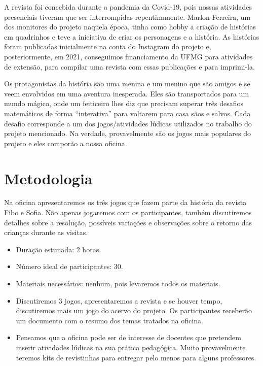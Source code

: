 \documentclass[12pt,oneside,a4paper]{article}
\begin{document}
A revista foi concebida durante a pandemia da Covid-19, pois nossas atividades presenciais tiveram que ser interrompidas repentinamente. Marlon Ferreira, um dos monitores do projeto naquela época, tinha como hobby a criação de histórias em quadrinhos e teve a iniciativa de criar os personagens e a história. As histórias foram publicadas inicialmente na conta do Instagram do projeto e, posteriormente, em 2021, conseguimos financiamento da UFMG para atividades de extensão, para compilar uma revista com essas publicações e para imprimi-la.

Os protagonistas da história são uma menina e um menino que são amigos e se veem envolvidos em uma aventura inesperada. Eles são transportados para um mundo mágico, onde um feiticeiro lhes diz que precisam superar três desafios matemáticos de forma “interativa” para voltarem para casa sãos e salvos. Cada desafio corresponde a um dos jogos/atividades lúdicas utilizados no
trabalho do projeto mencionado. Na verdade, provavelmente são os jogos mais populares do projeto e eles comporão a nossa oficina.

%
\section{Metodologia}

Na oficina apresentaremos os três jogos que fazem parte da história da revista Fibo e Sofia. Não apenas jogaremos com os participantes, também discutiremos detalhes sobre a resolução, possíveis variações e observações sobre o retorno das crianças durante as visitas.

\begin{itemize}
    \item Duração estimada: 2 horas.
    \item Número ideal de participantes: 30.
    \item Materiais necessários: nenhum, pois levaremos todos os materiais.
    \item Discutiremos 3 jogos, apresentaremos a revista e se houver tempo, discutiremos mais um jogo do acervo do projeto. Os participantes receberão um documento com o resumo dos temas tratados na oficina.
    \item Pensamos que a oficina pode ser de interesse de docentes que pretendem inserir atividades lúdicas na sua prática pedagógica. Muito provavelmente teremos kits de revistinhas para entregar pelo menos para alguns professores.
\end{itemize}
\end{document}
